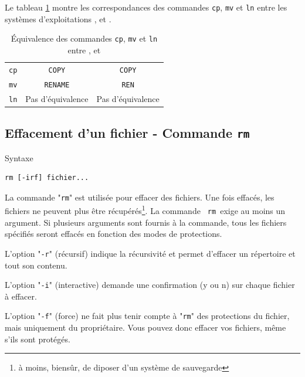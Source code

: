 Le tableau \ref{tab-cmds-equiv-mvcpln} montre les correspondances des commandes
{\tt cp}, {\tt mv} et {\tt ln} entre les syst{\`e}mes d'exploitations {\Unix},
{\OpenVMS} et {\DOS}.

\begin{table}[hbtp]
\centering
\begin{tabular}{|c|c|c|} 
	\hline
		{\Unix}		&	{\OpenVMS}	&	{\DOS}					\\
	\hline \hline
		{\tt cp}		&	{\tt COPY}		&	{\tt COPY}				\\
		{\tt mv}		&	{\tt RENAME}	&	{\tt REN}				\\
		{\tt ln}		&	Pas d'{\'e}quivalence	&	Pas d'{\'e}quivalence	\\
	\hline
\end{tabular}
\caption{\label{tab-cmds-equiv-mvcpln}\'{E}quivalence des commandes {\tt cp},
{\tt mv} et {\tt ln} entre {\Unix},{\OpenVMS} et {\DOS}}
\end{table}

\subsection{Effacement d'un fichier - Commande {\tt rm}}

\begin{definition}{Syntaxe}
\begin{verbatim}
rm [-irf] fichier...
\end{verbatim}
\end{definition}

La commande "{\tt rm}" est utilis{\'e}e pour effacer des fichiers. Une
fois effac{\'e}s, les fichiers ne peuvent plus {\^e}tre r{\'e}cup{\'e}r{\'e}s\footnote{{\`a}
moins, biens{\^u}r, de diposer d'un syst{\`e}me de sauvegarde}. La commande {\tt
rm }exige au moins un argument. Si plusieurs arguments sont fournis {\`a} la
commande, tous les fichiers sp{\'e}cifi{\'e}s seront effac{\'e}s en fonction des
modes de protections.

L'option "{\tt -r}" (r{\'e}cursif) indique la r{\'e}cursivit{\'e} et permet d'effacer un r{\'e}pertoire et tout son contenu.

L'option "{\tt -i}" (interactive) demande une confirmation (y ou n) sur chaque fichier {\`a} effacer.

L'option "{\tt -f}" (force) ne fait plus tenir compte {\`a} "{\tt rm}" des protections du fichier, mais uniquement du 
propri{\'e}taire. Vous pouvez donc effacer vos fichiers, m{\^e}me s'ils sont prot{\'e}g{\'e}s.

